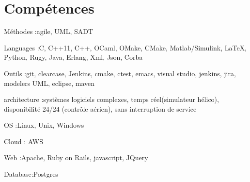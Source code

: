\section{Compétences}

\begin{itemize}

\myitem
{Méthodes :}{agile, UML, SADT}

\myitem
{Languages :}{C, C++11, C++, OCaml, OMake, CMake, Matlab/Simulink, LaTeX, Python, Rugy, Java, Erlang, Xml, Json, Corba}

\myitem
{Outils :}{git, clearcase, Jenkins, cmake, ctest, emacs, visual studio, jenkins, jira, modelers UML, eclipse, maven}

\myitem
{architecture :}{systèmes logiciels complexes, temps réel(simulateur hélico), disponibilité 24/24 (contrôle aérien), sans interruption de service}

\myitem
{OS :}{Linux, Unix, Windows}

\myitem
{Cloud} : {AWS}

\myitem 
{Web :}{Apache, Ruby on Rails, javascript, JQuery}

\myitem 
{Database:}{Postgres}

\end{itemize}
